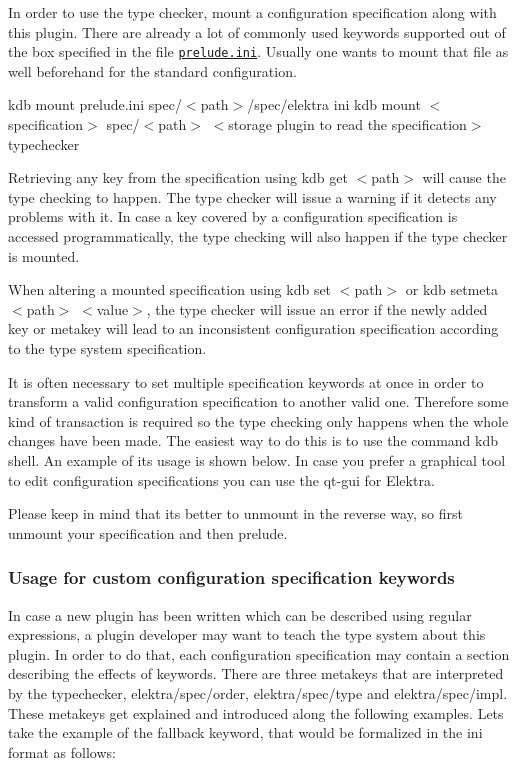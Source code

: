 In order to use the type checker, mount a configuration specification along with this plugin. There are already a lot of commonly used keywords supported out of the box specified in the file \href{/home/markus/Projekte/Elektra/current/src/plugins/typechecker/typechecker/prelude.ini}{\tt prelude.\+ini}. Usually one wants to mount that file as well beforehand for the standard configuration.

{\ttfamily kdb mount prelude.\+ini spec/$<$path$>$/spec/elektra ini} {\ttfamily kdb mount $<$specification$>$ spec/$<$path$>$ $<$storage plugin to read the specification$>$ typechecker}

Retrieving any key from the specification using {\ttfamily kdb get $<$path$>$} will cause the type checking to happen. The type checker will issue a warning if it detects any problems with it. In case a key covered by a configuration specification is accessed programmatically, the type checking will also happen if the type checker is mounted.

When altering a mounted specification using {\ttfamily kdb set $<$path$>$} or {\ttfamily kdb setmeta $<$path$>$ $<$value$>$}, the type checker will issue an error if the newly added key or metakey will lead to an inconsistent configuration specification according to the type system specification.

It is often necessary to set multiple specification keywords at once in order to transform a valid configuration specification to another valid one. Therefore some kind of transaction is required so the type checking only happens when the whole changes have been made. The easiest way to do this is to use the command {\ttfamily kdb shell}. An example of its usage is shown below. In case you prefer a graphical tool to edit configuration specifications you can use the qt-\/gui for Elektra.

Please keep in mind that its better to unmount in the reverse way, so first unmount your specification and then prelude.

\subsubsection*{Usage for custom configuration specification keywords}

In case a new plugin has been written which can be described using regular expressions, a plugin developer may want to teach the type system about this plugin. In order to do that, each configuration specification may contain a section describing the effects of keywords. There are three metakeys that are interpreted by the typechecker, {\ttfamily elektra/spec/order}, {\ttfamily elektra/spec/type} and {\ttfamily elektra/spec/impl}. These metakeys get explained and introduced along the following examples. Let\textquotesingle{}s take the example of the fallback keyword, that would be formalized in the ini format as follows\+:


